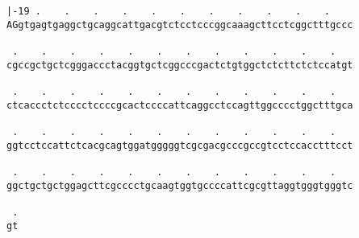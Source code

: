 \documentclass{article}
\begin{document}
\newpage
\begin{Verbatim}[fontfamily=courier]
 |-19 .    .    .    .    .    .    .    .    .    .    .   
AGgtgagtgaggctgcaggcattgacgtctcctcccggcaaagcttcctcggctttgccc

 .    .    .    .    .    .    .    .    .    .    .    .   
cgccgctgctcgggaccctacggtgctcggcccgactctgtggctctcttctctccatgt

 .    .    .    .    .    .    .    .    .    .    .    .   
ctcaccctctcccctccccgcactccccattcaggcctccagttggcccctggctttgca

 .    .    .    .    .    .    .    .    .    .    .    .   
ggtcctccattctcacgcagtggatgggggtcgcgacgcccgccgtcctccacctttcct

 .    .    .    .    .    .    .    .    .    .    .    .   
ggctgctgctggagcttcgcccctgcaagtggtgccccattcgcgttaggtgggtgggtc

 .
gt
\end{Verbatim}
\newpage
\end{document}
